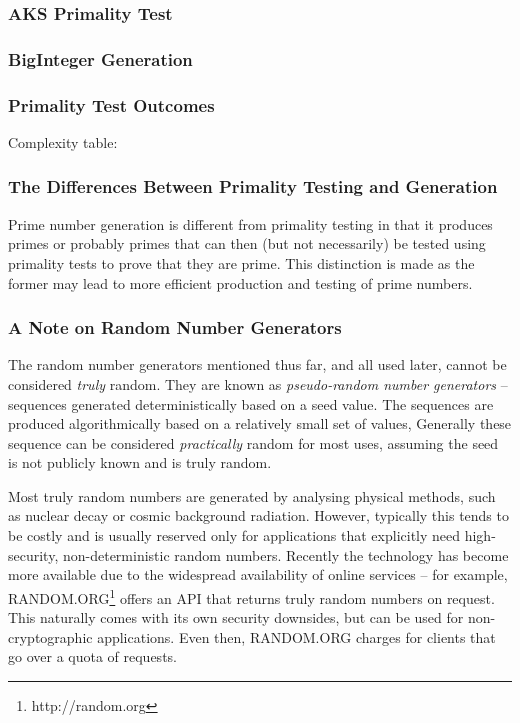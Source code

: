     \subsubsection{AKS Primality Test}
    
    \subsubsection{BigInteger Generation}
    
    \subsubsection{Primality Test Outcomes}
    
    Complexity table:
    
    \subsubsection{The Differences Between Primality Testing and Generation}
    
    Prime number generation is different from primality testing in that it produces primes or probably primes that can then (but not necessarily) be tested using primality tests to prove that they are prime. This distinction is made as the former may lead to more efficient production and testing of prime numbers.
  
    \subsubsection{A Note on Random Number Generators}
    
    The random number generators mentioned thus far, and all used later, cannot be considered \emph{truly} random. They are known as \emph{pseudo-random number generators} -- sequences generated deterministically based on a seed value. The sequences are produced algorithmically based on a relatively small set of values, Generally these sequence can be considered \emph{practically} random for most uses, assuming the seed is not publicly known and is truly random.
    
    Most truly random numbers are generated by analysing physical methods, such as nuclear decay or cosmic background radiation. However, typically this tends to be costly and is usually reserved only for applications that explicitly need high-security, non-deterministic random numbers. Recently the technology has become more available due to the widespread availability of online services -- for example, RANDOM.ORG\footnote{http://random.org} offers an API that returns truly random numbers on request. This naturally comes with its own security downsides, but can be used for non-cryptographic applications. Even then, RANDOM.ORG charges for clients that go over a quota of requests.
    
